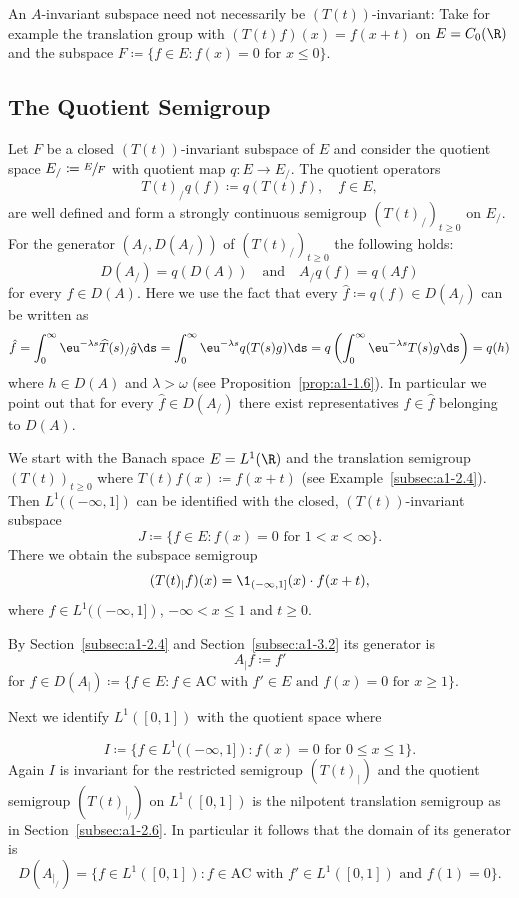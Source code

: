 An $A$-invariant subspace need not necessarily be $(T(t))$-invariant:
Take for example the translation group with $(T(t)f)(x) = f(x+t)$ on $E = C_{0}(\R)$ and the subspace $F \coloneqq \{f \in E \colon f(x) = 0 \text{ for } x \leq 0\}$.
\subsection{The Quotient Semigroup}\label{subsec:a1-3.4}%
Let $F$ be a closed $(T(t))$-invariant subspace of\/ $E$ and consider the quotient space 
$ E_{/} \coloneqq \sfrac{E}{F} $ 
with quotient map $q \colon E \to E_{/}$. 
The quotient operators
\[
    T(t)_{/}q(f) \coloneqq q(T(t)f), \quad f \in E,
\]
are well defined and form a strongly continuous semigroup $(T(t)_{/})_{t \geq 0}$ on $E_{/}$.
For the generator $(A_{/},D(A_{/}))$ of\/ $(T(t)_{/})_{t \geq 0}$ the following holds:
\[
    D(A_{/}) = q(D(A)) 
    \quad \text{and} \quad 
    A_{/}q(f) = q(Af)
\]
for every $f \in D(A)$.
Here we use the fact that every $\hat{f} \coloneqq q(f) \in D(A_{/})$ can be written as
\[
    \hat{f} = \int_{0}^{\infty}  \eu^{-\lambda s} \widehat{T}(s)_{/}\hat{g} \ds 
    = \int_{0}^{\infty}  \eu^{-\lambda s}q(T(s)g) \ds 
    = q\left(\int_{0}^{\infty}  \eu^{-\lambda s}T(s)g \ds\right) = q(h)
\]
where $h \in D(A)$ and $\lambda > \omega$ (see Proposition~\ref{prop:a1-1.6}).
In particular we point out that for every $\hat{f} \in D(A_{/})$ there exist representatives $f \in \hat{f}$ belonging to $D(A)$.
\begin{example*}\label{ex:a1-3.1}%
We start with the Banach space $E = L^{1}(\R)$ and the translation semigroup $(T(t))_{t \geq 0}$ where $T(t)f(x) \coloneqq f(x+t)$ (see Example~\ref{subsec:a1-2.4}).
Then $L^{1}((-\infty,1])$ can be identified with the closed, $(T(t))$-invariant subspace
\[
    J \coloneqq \{f \in E \colon f(x) = 0 \text{ for } 1 < x < \infty\} .
\]
There we obtain the subspace semigroup
\[
    (T(t)_{|}f)(x) = \1_{(-\infty,1]}(x) \cdot f(x+t),
\]
where $f \in L^{1}((-\infty,1])$, $-\infty < x \leq 1$ and $t \geq 0$.

By Section~\ref{subsec:a1-2.4} and Section~\ref{subsec:a1-3.2} its generator is
\[
    A_{|}f \coloneqq f'
\]
for $f \in D(A_{|}) \coloneqq \{f \in E \colon f \in \text{AC} \text{ with } f' \in E \text{ and } f(x) = 0 \text{ for } x \geq 1\}$.

Next we identify $L^{1}(\left[ 0,1 \right])$ with the quotient space \sfrac{$L^{1}((-\infty,1])$}{I} where

\[
    I \coloneqq \{f \in L^{1}((-\infty,1]) \colon f(x) = 0 \text{ for } 0 \leq x \leq 1\} .
\]
Again $I$ is invariant for the restricted semigroup $(T(t)_{|})$ and the
quotient semigroup $(T(t)_{\vert _{/}})$ on $L^{1}(\left[ 0,1 \right])$ is the nilpotent translation semigroup as in Section~\ref{subsec:a1-2.6}.
In particular it follows that the domain of its generator is
\[
    D(A_{|_{/}}) = \{f \in L^{1}(\left[ 0,1 \right]) \colon f \in \text{AC} \text{ with } f' \in L^{1}(\left[ 0,1 \right]) \text{ and } f(1) = 0\}.
\]
\end{example*}
